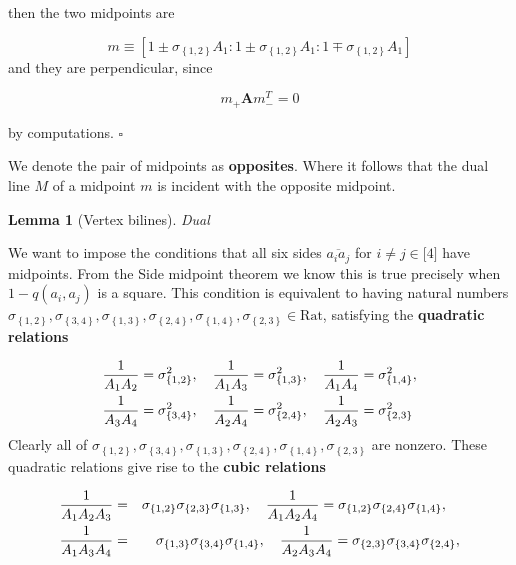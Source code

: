 \documentclass[11pt]{article}
\newtheorem{theorem}{Theorem}
\newtheorem{theorem}{Lemma}
\begin{document}
then the two midpoints are

\begin{equation*}
m\equiv \left[ 1\pm \sigma _{\left\{ 1,2\right\} }A_{1}:1\pm \sigma
_{\left\{ 1,2\right\} }A_{1}:1\mp \sigma _{\left\{ 1,2\right\} }A_{1}\right]
\end{equation*}
and they are perpendicular, since

\begin{equation*}
m_{+}\mathbf{A}m_{-}^{T}=0
\end{equation*}

\bigskip by computations. $\square $

We denote the pair of midpoints as \textbf{opposites}. Where it follows that
the dual line $M$ of a midpoint $m$ is incident with the opposite midpoint.

\begin{theorem}[Vertex bilines]
Dual
\end{theorem}

We want to impose the conditions that all six sides $\overline{a_{i}a_{j}}$
for $i\neq j\in \lbrack 4]$ have midpoints. From the Side midpoint theorem
we know this is true precisely when $1-q(a_{i},a_{j})$ is a square. This
condition is equivalent to having natural numbers $\sigma _{\left\{
1,2\right\} },\sigma _{\left\{ 3,4\right\} },\sigma _{\left\{ 1,3\right\}
},\sigma _{\left\{ 2,4\right\} },\sigma _{\left\{ 1,4\right\} },\sigma
_{\left\{ 2,3\right\} }\in \text{Rat}$, satisfying the \textbf{quadratic
relations}

\begin{align}
\frac{1}{A_{1}A_{2}}& =\sigma _{\left\{ 1,2\right\} }^{2},\quad \frac{1}{%
A_{1}A_{3}}=\sigma _{\left\{ 1,3\right\} }^{2},\quad \frac{1}{A_{1}A_{4}}%
=\sigma _{\left\{ 1,4\right\} }^{2},  \label{Quadratic Relations} \\
\frac{1}{A_{3}A_{4}}& =\sigma _{\left\{ 3,4\right\} }^{2},\quad \frac{1}{%
A_{2}A_{4}}=\sigma _{\left\{ 2,4\right\} }^{2},\quad \frac{1}{A_{2}A_{3}}%
=\sigma _{\left\{ 2,3\right\} }^{2}
\end{align}%
\qquad Clearly all of $\sigma _{\left\{ 1,2\right\} },\sigma _{\left\{
3,4\right\} },\sigma _{\left\{ 1,3\right\} },\sigma _{\left\{ 2,4\right\}
},\sigma _{\left\{ 1,4\right\} },\sigma _{\left\{ 2,3\right\} }$ are
nonzero. These quadratic relations give rise to the \textbf{cubic relations}

\begin{eqnarray}
\frac{1}{A_{1}A_{2}A_{3}} &=&\sigma _{\left\{ 1,2\right\} }\sigma _{\left\{
2,3\right\} }\sigma _{\left\{ 1,3\right\} },\quad \frac{1}{A_{1}A_{2}A_{4}}%
=\sigma _{\left\{ 1,2\right\} }\sigma _{\left\{ 2,4\right\} }\sigma
_{\left\{ 1,4\right\} },\quad  \label{Cubic Relations} \\
\frac{1}{A_{1}A_{3}A_{4}} &=&\sigma _{\left\{ 1,3\right\} }\sigma _{\left\{
3,4\right\} }\sigma _{\left\{ 1,4\right\} },\quad \frac{1}{A_{2}A_{3}A_{4}}%
=\sigma _{\left\{ 2,3\right\} }\sigma _{\left\{ 3,4\right\} }\sigma
_{\left\{ 2,4\right\} },  \notag
\end{eqnarray}
\end{document}
